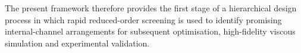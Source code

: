 \documentclass[a4paper,fleqn]{cas-dc}
\begin{document}
	The present framework therefore provides the first stage of a hierarchical
	design process in which rapid reduced-order screening is used to identify
	promising internal-channel arrangements for subsequent optimisation,
	high-fidelity viscous simulation and experimental validation.
	
	
\end{document}
